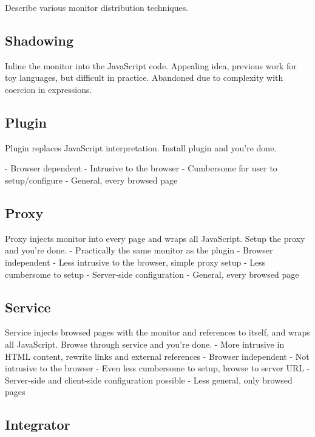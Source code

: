 \documentclass{llncs}
\begin{document}
Describe various monitor distribution techniques.

\subsection{Shadowing}

Inline the monitor into the JavaScript code. Appealing idea, previous work for 
toy languages, but difficult in practice. Abandoned due to complexity with 
coercion in expressions.

\subsection{Plugin}

Plugin replaces JavaScript interpretation. Install plugin and you're done.
\begin{list}
\item- Browser dependent
- Intrusive to the browser
- Cumbersome for user to setup/configure
- General, every browsed page
\end{list}

\subsection{Proxy}

Proxy injects monitor into every page and wraps all JavaScript. Setup the proxy 
and you're done.
- Practically the same monitor as the plugin
- Browser independent
- Less intrusive to the browser, simple proxy setup
- Less cumbersome to setup
- Server-side configuration
- General, every browsed page

\subsection{Service}

Service injects browsed pages with the monitor and references to itself, and 
wraps all JavaScript. Browse through service and you're done.
- More intrusive in HTML content, rewrite links and external references 
- Browser independent
- Not intrusive to the browser
- Even less cumbersome to setup, browse to server URL
- Server-side and client-side configuration possible
- Less general, only browsed pages

\subsection{Integrator}
\end{document}
